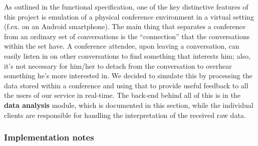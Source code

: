 \documentclass[12p, a4paper, onecolumn]{report}
\begin{document}
As outlined in the functional specification, one of the key distinctive features of this project is emulation of a physical conference environment in a virtual setting (f.ex. on an Android smartphone). The main thing that separates a conference from an ordinary set of conversations is the “connection” that the conversations within the set have. A conference attendee, upon leaving a conversation, can easily listen in on other conversations to find something that interests him; also, it’s not necessary for him/her to detach from the conversation to overhear something he’s more interested in. We decided to simulate this by processing the data stored within a conference and using that to provide useful feedback to all the users of our service in real-time. The back-end behind all of this is in the \textbf{data analysis} module, which is documented in this section, while the individual clients are responsible for handling the interpretation of the received raw data.

\subsubsection{Implementation notes}
\end{document}
